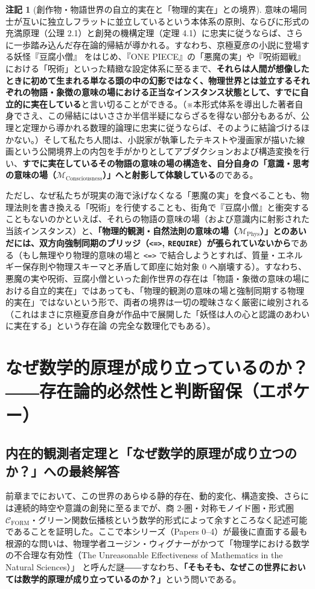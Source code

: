 \documentclass[11pt,a4paper]{ltjsarticle}
\theoremstyle{definition}
\newtheorem{remark}{注記}[section]
\theoremstyle{plain}
\begin{document}
\begin{remark}[創作物・物語世界の自立的実在と「物理的実在」との境界]
意味の場同士が互いに独立しフラットに並立しているという本体系の原則、ならびに形式の充満原理（公理 2.1）と創発の機構定理（定理 4.1）に忠実に従うならば、さらに一歩踏み込んだ存在論的帰結が導かれる。すなわち、京極夏彦の小説に登場する妖怪『豆腐小僧』\cite{Kyogoku1999} をはじめ、『ONE PIECE』の「悪魔の実」や『呪術廻戦』における「呪術」といった精緻な設定体系に至るまで、\textbf{それらは人間が想像したときに初めて生まれる単なる頭の中の幻影ではなく、物理世界とは並立するそれぞれの物語・象徴の意味の場における正当なインスタンス状態として、すでに自立的に実在している}と言い切ることができる。（※本形式体系を導出した著者自身でさえ、この帰結にはいささか半信半疑にならざるを得ない部分もあるが、公理と定理から導かれる数理的論理に忠実に従うならば、そのように結論づけるほかない。）そして私たち人間は、小説家が執筆したテキストや漫画家が描いた線画という公開境界上の内包を手がかりとしてアブダクションおよび構造変換を行い、\textbf{すでに実在しているその物語の意味の場の構造を、自分自身の「意識・思考の意味の場（$\mathcal{M}_{\mathrm{Consciousness}}$）」へと射影して体験している}のである。

ただし、なぜ私たちが現実の海で泳げなくなる「悪魔の実」を食べることも、物理法則を書き換える「呪術」を行使することも、街角で『豆腐小僧』と衝突することもないのかといえば、それらの物語の意味の場（および意識内に射影された当該インスタンス）と、\textbf{「物理的観測・自然法則の意味の場（$\mathcal{M}_{\mathrm{Phys}}$）」とのあいだには、双方向強制同期のブリッジ（\texttt{<=>}, \texttt{REQUIRE}）が張られていないから}である（もし無理やり物理的意味の場と \texttt{<=>} で結合しようとすれば、質量・エネルギー保存則や物理スキーマと矛盾して即座に始対象 $0$ へ崩壊する）。すなわち、悪魔の実や呪術、豆腐小僧といった創作世界の存在は「物語・象徴の意味の場における自立的実在」ではあっても、「物理的観測の意味の場と強制同期する物理的実在」ではないという形で、両者の境界は一切の曖昧さなく厳密に峻別される（これはまさに京極夏彦自身が作品中で展開した「妖怪は人の心と認識のあわいに実在する」という存在論 \cite{Kyogoku1999} の完全な数理化でもある）。
\end{remark}
\section{なぜ数学的原理が成り立っているのか？――存在論的必然性と判断留保（エポケー）}

\subsection{内在的観測者定理と「なぜ数学的原理が成り立つのか？」への最終解答}
前章までにおいて、この世界のあらゆる静的存在、動的変化、構造変換、さらには連続的時空や意識の創発に至るまでが、商 2-圏・対称モノイド圏・形式圏 $\mathcal{C}_{\mathrm{FORM}}$・グリーン関数伝播核という数学的形式によって余すところなく記述可能であることを証明した。ここで本シリーズ（Papers 0--4）が最後に直面する最も根源的な問いは、物理学者ユージン・ウィグナーがかつて「物理学における数学の不合理な有効性（The Unreasonable Effectiveness of Mathematics in the Natural Sciences）」\cite{Wigner1960} と呼んだ謎――すなわち、\textbf{「そもそも、なぜこの世界においては数学的原理が成り立っているのか？」}という問いである。
\end{document}
